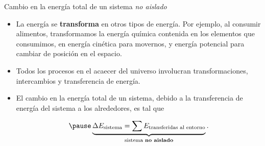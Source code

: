     
    \begin{frame}{Cambio en la energía total de un sistema \textit{no aislado}}
        
        \begin{itemize}
            \pause \item La energía se \textbf{transforma} en otros tipos de energía. Por ejemplo, al consumir alimentos, transformamos la energía química contenida en los elementos que consumimos, en energía cinética para movernos, y energía potencial para cambiar de posición en el espacio.
            
            \pause \item Todos los procesos en el acaecer del universo involucran transformaciones, intercambios y transferencia de energía.
            \pause \item El cambio en la energía total de un sistema, debido a la transferencia de energía del sistema a los alrededores, es tal que
            
            \begin{equation}
                \pause \underbrace{\Delta E_{\text{sistema}}=\sum E_{\text{transferidas al entorno}}}_{\text{sistema \textbf{no aislado}}}.
            \end{equation}
        \end{itemize}
        
        
    \end{frame}
    

